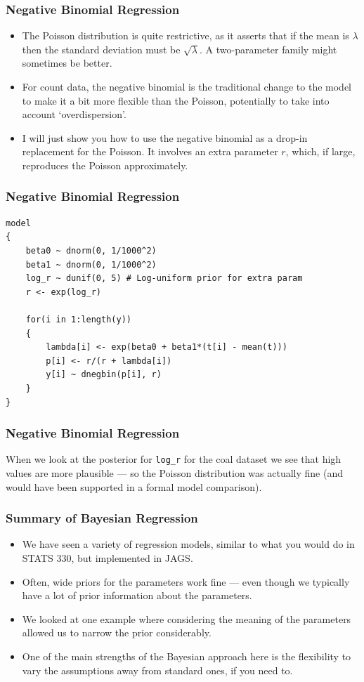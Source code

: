 \documentclass{beamer}
\begin{document}
\begin{frame}
\frametitle{Negative Binomial Regression}
\begin{itemize}
\item The Poisson distribution is quite restrictive, as it asserts that if the
mean is $\lambda$ then the standard deviation must be $\sqrt{\lambda}$.
A two-parameter family might sometimes be better.\pause
\item For count data, the negative binomial is the traditional change to the
model to make it a bit more flexible than the Poisson, potentially to take
into account `overdispersion'.\pause
\item I will just show you how to use the negative binomial as a drop-in
replacement for the Poisson. It involves an extra parameter $r$, which,
if large, reproduces the Poisson approximately.
\end{itemize}

\end{frame}

\begin{frame}[fragile]
\frametitle{Negative Binomial Regression}
\footnotesize
\begin{verbatim}
model
{
    beta0 ~ dnorm(0, 1/1000^2)
    beta1 ~ dnorm(0, 1/1000^2)
    log_r ~ dunif(0, 5) # Log-uniform prior for extra param
    r <- exp(log_r)

    for(i in 1:length(y))
    {
        lambda[i] <- exp(beta0 + beta1*(t[i] - mean(t)))
        p[i] <- r/(r + lambda[i])
        y[i] ~ dnegbin(p[i], r)
    }
}
\end{verbatim}

\end{frame}

\begin{frame}[fragile]
\frametitle{Negative Binomial Regression}
When we look at the posterior for \texttt{log_r} for the coal dataset
we see that high values are more plausible --- so the Poisson distribution
was actually fine (and would have been supported in a formal model comparison).

\end{frame}



\begin{frame}[fragile]
\frametitle{Summary of Bayesian Regression}

\begin{itemize}
\item We have seen a variety of regression models, similar to what you would
do in STATS 330, but implemented in JAGS.\pause
\item Often, wide priors for the parameters work fine --- even though we typically
have a lot of prior information about the parameters.\pause
\item We looked at one example where considering the meaning of the parameters
allowed us to narrow the prior considerably.\pause
\item One of the main strengths of the Bayesian approach here is the flexibility
to vary the assumptions away from standard ones, if you need to.
\end{itemize}

\end{frame}
\end{document}
